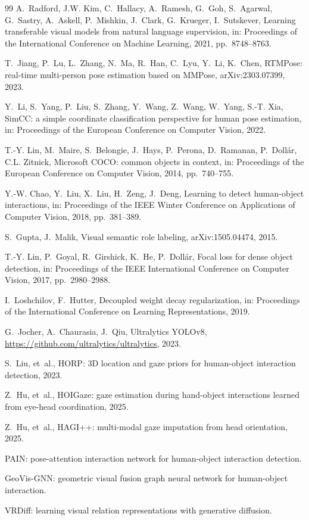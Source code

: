 \documentclass[12pt,a4paper]{article}
\begin{document}
{\begin{thebibliography}{99}
A.~Radford, J.W. Kim, C.~Hallacy, A.~Ramesh, G.~Goh, S.~Agarwal, G.~Sastry, A.~Askell, P.~Mishkin, J.~Clark, G.~Krueger, I.~Sutskever, Learning transferable visual models from natural language supervision, in: Proceedings of the International Conference on Machine Learning, 2021, pp.~8748--8763.

T.~Jiang, P.~Lu, L.~Zhang, N.~Ma, R.~Han, C.~Lyu, Y.~Li, K.~Chen, RTMPose: real-time multi-person pose estimation based on MMPose, arXiv:2303.07399, 2023.

Y.~Li, S.~Yang, P.~Liu, S.~Zhang, Y.~Wang, Z.~Wang, W.~Yang, S.-T. Xia, SimCC: a simple coordinate classification perspective for human pose estimation, in: Proceedings of the European Conference on Computer Vision, 2022.

T.-Y. Lin, M.~Maire, S.~Belongie, J.~Hays, P.~Perona, D.~Ramanan, P.~Doll\'{a}r, C.L. Zitnick, Microsoft COCO: common objects in context, in: Proceedings of the European Conference on Computer Vision, 2014, pp.~740--755.

Y.-W. Chao, Y.~Liu, X.~Liu, H.~Zeng, J.~Deng, Learning to detect human-object interactions, in: Proceedings of the IEEE Winter Conference on Applications of Computer Vision, 2018, pp.~381--389.

S.~Gupta, J.~Malik, Visual semantic role labeling, arXiv:1505.04474, 2015.

T.-Y. Lin, P.~Goyal, R.~Girshick, K.~He, P.~Doll\'{a}r, Focal loss for dense object detection, in: Proceedings of the IEEE International Conference on Computer Vision, 2017, pp.~2980--2988.

I.~Loshchilov, F.~Hutter, Decoupled weight decay regularization, in: Proceedings of the International Conference on Learning Representations, 2019.

G.~Jocher, A.~Chaurasia, J.~Qiu, Ultralytics YOLOv8, \url{https://github.com/ultralytics/ultralytics}, 2023.

S.~Liu, et~al., HORP: 3D location and gaze priors for human-object interaction detection, 2023. %

Z.~Hu, et~al., HOIGaze: gaze estimation during hand-object interactions learned from eye-head coordination, 2025. %

Z.~Hu, et~al., HAGI++: multi-modal gaze imputation from head orientation, 2025. %

PAIN: pose-attention interaction network for human-object interaction detection. %

GeoVis-GNN: geometric visual fusion graph neural network for human-object interaction. %

VRDiff: learning visual relation representations with generative diffusion. %

\end{thebibliography}
}
\end{document}
